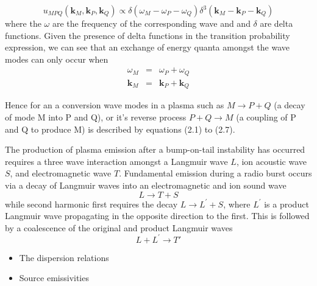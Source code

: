 \begin{equation}
u_{MPQ}(\mathbf{k}_M, \mathbf{k}_P, \mathbf{k}_Q)  \propto \delta(\omega_M - \omega_P - \omega_Q ) \delta^3(\mathbf{k}_M - \mathbf{k}_P - \mathbf{k}_Q )
\end{equation}
where the $\omega$ are the frequency of the corresponding wave and and $\delta$ are delta functions. Given the presence of delta functions in the transition probability expression, we can see that an exchange of energy quanta amongst the wave modes can only occur when 
\begin{eqnarray}
\omega_M & = & \omega_P + \omega_Q \\
\mathbf{k}_M & = & \mathbf{k}_P + \mathbf{k}_Q
\end{eqnarray}

Hence for an a conversion wave modes in a plasma such as $M \rightarrow P + Q$ (a decay of mode M into P and Q), or it's reverse process $P + Q \rightarrow M $ (a coupling of P and Q to produce M) is described by equations (2.1) to (2.7). 

The production of plasma emission after a bump-on-tail instability has occurred requires a three wave interaction amongst a Langmuir wave $L$, ion acoustic wave $S$, and electromagnetic wave $T$. Fundamental emission during a radio burst occurs via a decay of Langmuir waves into an electromagnetic and ion sound wave
\begin{equation}
L \rightarrow T + S
\end{equation}
while second harmonic first requires the decay $L\rightarrow L^{'} + S$, where $L^{'}$ is a product Langmuir wave propagating in the opposite direction to the first. This is followed by a coalescence of the original and product Langmuir waves
\begin{equation}
L + L^{'}\rightarrow T'
\end{equation}


\begin{itemize}
\item The dispersion relations
\item Source emissivities
\end{itemize}


